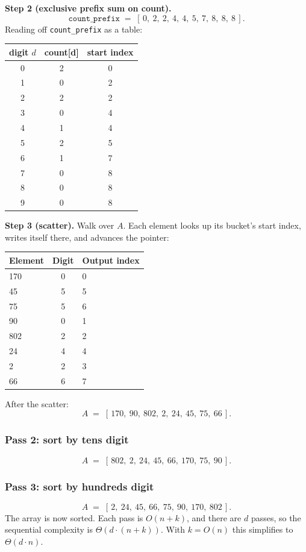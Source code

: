 \textbf{Step 2 (exclusive prefix sum on count).}
\[
\texttt{count\_prefix} \;=\; [\,0,\ 2,\ 2,\ 4,\ 4,\ 5,\ 7,\ 8,\ 8,\ 8\,].
\]
Reading off \texttt{count\_prefix} as a table:
\begin{center}
\begin{tabular}{ccc}
\toprule
\textbf{digit $d$} & \textbf{count[d]} & \textbf{start index} \\
\midrule
0 & 2 & 0 \\
1 & 0 & 2 \\
2 & 2 & 2 \\
3 & 0 & 4 \\
4 & 1 & 4 \\
5 & 2 & 5 \\
6 & 1 & 7 \\
7 & 0 & 8 \\
8 & 0 & 8 \\
9 & 0 & 8 \\
\bottomrule
\end{tabular}
\end{center}

\textbf{Step 3 (scatter).} Walk over $A$. Each element looks up its
bucket's start index, writes itself there, and advances the pointer:
\begin{center}
\begin{tabular}{lcl}
\toprule
\textbf{Element} & \textbf{Digit} & \textbf{Output index} \\
\midrule
170 & 0 & 0 \\
45  & 5 & 5 \\
75  & 5 & 6 \\
90  & 0 & 1 \\
802 & 2 & 2 \\
24  & 4 & 4 \\
2   & 2 & 3 \\
66  & 6 & 7 \\
\bottomrule
\end{tabular}
\end{center}
After the scatter:
\[
A \;=\; [\,170,\ 90,\ 802,\ 2,\ 24,\ 45,\ 75,\ 66\,].
\]

\subsubsection*{Pass 2: sort by tens digit}
\[
A \;=\; [\,802,\ 2,\ 24,\ 45,\ 66,\ 170,\ 75,\ 90\,].
\]

\subsubsection*{Pass 3: sort by hundreds digit}
\[
A \;=\; [\,2,\ 24,\ 45,\ 66,\ 75,\ 90,\ 170,\ 802\,].
\]
The array is now sorted. Each pass is $O(n + k)$, and there are $d$
passes, so the sequential complexity is $\Theta(d \cdot (n + k))$. With
$k = O(n)$ this simplifies to $\Theta(d \cdot n)$.

